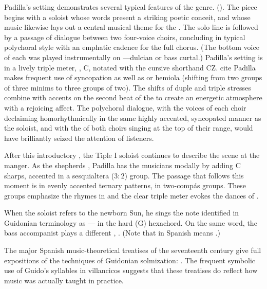 Padilla's setting demonstrates several typical features of the genre.%
().
The piece begins with a soloist whose words present a striking poetic conceit, 
and whose music likewise lays out a central musical theme for the 
.
The solo line is followed by a passage of dialogue between two four-voice 
choirs, concluding in typical polychoral style with an emphatic cadence for the 
full chorus.
(The bottom voice of each was played instrumentally on ---dulcian 
or bass curtal.)
Padilla's setting is in a lively triple meter, , C, notated with the cursive shorthand CZ. %
cite
Padilla makes frequent use of syncopation as well as  or 
hemiola (shifting from two groups of three minims to three groups of two).
The shifts of duple and triple stresses combine with accents on the second beat 
of the  to create an energetic atmosphere 
with a rejoicing affect.
The polychoral dialogue, with the voices of each choir declaiming 
homorhythmically in the same highly accented, syncopated manner as the soloist, 
and with the  of both choirs singing at the top of 
their range, would have brilliantly seized the attention of listeners.


After this introductory , the Tiple I soloist continues to 
describe the scene at the manger.
As the shepherds , Padilla has the musicians 
 modally by adding C sharps, accented in a sesquialtera ($3:2$) 
group. 
The passage that follows this moment is in evenly accented ternary patterns, in 
two-compás groups.
These groups emphasize the rhymes in  
and the clear triple meter evokes the dances of .

When the soloist refers to the newborn Sun, he sings the note identified in 
Guidonian terminology as --- in the hard (G) 
hexachord.
On the same word, the bass accompanist plays a different , 
.
(Note that  in Spanish means .)%
  \begin{Footnote}
  The major Spanish music-theoretical treatises of the seventeenth century give 
full expositions of the techniques of Guidonian solmization: 
\autocites{Cerone:Melopeo}{Lorente:Porque}.
  The frequent symbolic use of Guido's syllables in villancicos suggests that 
these treatises do reflect how music was actually taught in practice.
  \end{Footnote}

